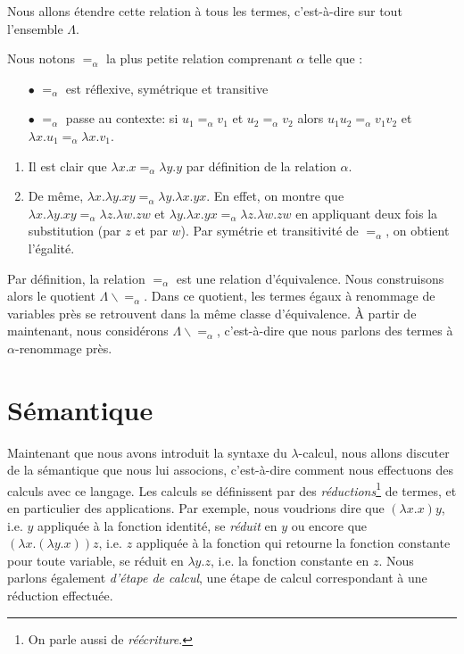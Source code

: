 Nous allons étendre cette relation à tous les termes, c'est-à-dire sur tout l'ensemble $\Lambda$.

Nous notons $=_{\alpha}$ la plus petite relation comprenant $\alpha$ telle que :
\begin{itemize}
  \item[$\bullet$] $=_{\alpha}$ est réflexive, symétrique et transitive
  \item[$\bullet$] $=_{\alpha}$ passe au contexte: si $u_{1} =_{\alpha} v_{1}$
    et $u_{2} =_{\alpha} v_{2}$ alors $u_{1}u_{2} =_{\alpha} v_{1}v_{2}$ et
    $\lambda x . u_{1} =_{\alpha} \lambda x . v_{1}$.
\end{itemize}

\begin{exemple}
  \begin{enumerate}
    \item Il est clair que $\lambda x . x =_{\alpha} \lambda y . y$ par
    définition de la relation $\alpha$.
    \item De même, $\lambda x . \lambda y . x y =_{\alpha} \lambda y . \lambda x
      . y x$. En
      effet, on montre que $\lambda x . \lambda y . x y =_{\alpha} \lambda z .
      \lambda w. z
      w$ et $\lambda y . \lambda x . y x =_{\alpha} \lambda z . \lambda w . z w$ en appliquant
      deux fois la substitution (par $z$ et par $w$). Par symétrie
      et transitivité de $=_{\alpha}$, on obtient l'égalité.
  \end{enumerate}
\end{exemple}

Par définition, la relation $=_{\alpha}$ est une relation d'équivalence. Nous
construisons alors le quotient $\Lambda \backslash =_{\alpha}$. Dans ce
quotient, les termes égaux à renommage de variables près se retrouvent dans la
même classe d'équivalence. À partir de maintenant, nous considérons $\Lambda
\backslash =_{\alpha}$, c'est-à-dire que nous parlons des termes à $\alpha$-renommage près.

\section{Sémantique}

Maintenant que nous avons introduit la syntaxe du $\lambda$-calcul, nous allons
discuter de la sémantique que nous lui associons, c'est-à-dire comment nous
effectuons des calculs avec ce langage. Les calculs
se définissent par des \textit{réductions}\footnote{On parle aussi de
\textit{réécriture}.} de termes, et en particulier des applications. Par exemple,
nous voudrions dire que $(\lambda x . x) y$, i.e. $y$ appliquée à la fonction
identité, se \textit{réduit} en $y$ ou encore que $(\lambda x . (\lambda y . x))
z$, i.e. $z$ appliquée à la fonction qui retourne la fonction constante pour
toute variable, se réduit en $\lambda y . z$, i.e. la fonction
constante en $z$. Nous parlons également \textit{d'étape de calcul}, une étape
de calcul correspondant à une réduction effectuée.

